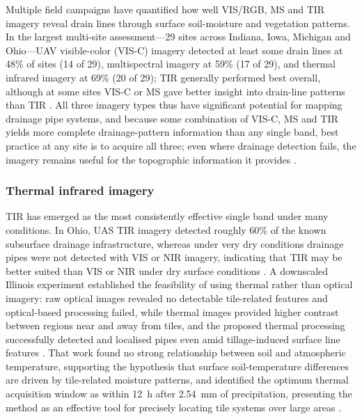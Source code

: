 \documentclass[11pt]{article}
\begin{document}
Multiple field campaigns have quantified how well VIS/RGB, MS and TIR imagery reveal drain lines through surface soil-moisture and vegetation patterns. In the largest multi-site assessment---29 sites across Indiana, Iowa, Michigan and Ohio---UAV visible-color (VIS-C) imagery detected at least some drain lines at 48\% of sites (14 of 29), multispectral imagery at 59\% (17 of 29), and thermal infrared imagery at 69\% (20 of 29); TIR generally performed best overall, although at some sites VIS-C or MS gave better insight into drain-line patterns than TIR \parencite{Allred2020}. All three imagery types thus have significant potential for mapping drainage pipe systems, and because some combination of VIS-C, MS and TIR yields more complete drainage-pattern information than any single band, best practice at any site is to acquire all three; even where drainage detection fails, the imagery remains useful for the topographic information it provides \parencite{Allred2020}.

\subsubsection{Thermal infrared imagery}

TIR has emerged as the most consistently effective single band under many conditions. In Ohio, UAS TIR imagery detected roughly 60\% of the known subsurface drainage infrastructure, whereas under very dry conditions drainage pipes were not detected with VIS or NIR imagery, indicating that TIR may be better suited than VIS or NIR under dry surface conditions \parencite{Allred2018}. A downscaled Illinois experiment established the feasibility of using thermal rather than optical imagery: raw optical images revealed no detectable tile-related features and optical-based processing failed, while thermal images provided higher contrast between regions near and away from tiles, and the proposed thermal processing successfully detected and localised pipes even amid tillage-induced surface line features \parencite{Woo2019}. That work found no strong relationship between soil and atmospheric temperature, supporting the hypothesis that surface soil-temperature differences are driven by tile-related moisture patterns, and identified the optimum thermal acquisition window as within 12~h after 2.54~mm of precipitation, presenting the method as an effective tool for precisely locating tile systems over large areas \parencite{Woo2019}.
\end{document}

